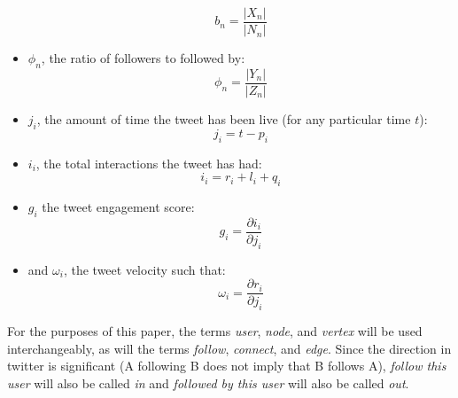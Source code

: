 \documentclass[NETN,manuscript]{stjour-new}
\begin{document}
\begin{itemize}
\begin{equation}
    b_n = \frac{|X_n|}{|N_n|}
    \end{equation}
    \item $\phi_n$, the ratio of followers to followed by: 
    \begin{equation}
      \phi_n = \frac{|Y_n|}{|Z_n|}  
    \end{equation}
    \item $j_i$, the amount of time the tweet has been live (for any particular time $t$):
    \begin{equation}
    \label{j_i}
       j_i = t - p_i
    \end{equation}
    \item $i_i$, the total interactions the tweet has had:
    \begin{equation}
    i_i = r_i+l_i+q_i
    \end{equation}
    \item $g_i$ the tweet engagement score:
\begin{equation}
\label{tweetengagementscore}
    g_i=\frac{\partial i_i}{\partial j_i}
\end{equation}
    \item and $\omega_i$, the tweet velocity such that:
\begin{equation}
\label{tweetvelocity}
    \omega_i=\frac{\partial r_i}{\partial j_i}
\end{equation}
\end{itemize} 

For the purposes of this paper, the terms \textit{user}, \textit{node}, and \textit{vertex} will be used interchangeably, as will the terms \textit{follow}, \textit{connect}, and \textit{edge}. Since the direction in twitter is significant (A following B does not imply that B follows A), \textit{follow this user} will also be called \textit{in} and \textit{followed by this user} will also be called \textit{out}.
\end{document}
